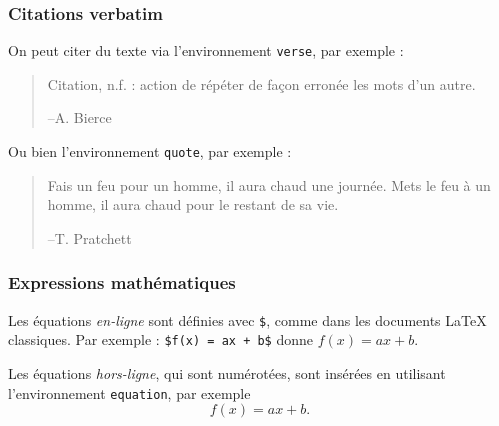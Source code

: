 \documentclass[10pt,    %
    french,             %
    xcolor=table,       %
    envcountsect        %
]{beamer}
\begin{document}
\begin{frame}
    \frametitle{Citations verbatim}
    
    \vspace{0.25cm}
    On peut citer du texte via l'environnement \texttt{verse}, par exemple :
    \begin{verse}
        Citation, n.f. : action de répéter de façon erronée les mots d’un autre. \\ 
        \vspace{-0.5cm}
        \begin{flushright}--A. Bierce\end{flushright}
    \end{verse}
    
    Ou bien l'environnement \texttt{quote}, par exemple :
    \begin{quote}
        Fais un feu pour un homme, il aura chaud une journée. Mets le feu à un homme, il aura chaud pour le restant de sa vie. \\ 
        \vspace{-0.5cm}
        \begin{flushright}--T. Pratchett\end{flushright}
    \end{quote}
\end{frame}
    
\begin{frame}
    \frametitle{Expressions mathématiques}
    
    Les équations \textit{en-ligne} sont définies avec \texttt{\$}, comme dans les documents \LaTeX{} classiques. Par exemple : \texttt{\$f(x) = ax + b\$} donne $f(x)=ax + b$.
    
    \vspace{0.25cm}
    Les équations \textit{hors-ligne}, qui sont numérotées, sont insérées en utilisant l'environnement \texttt{equation}, par exemple
    \begin{equation}
        \label{equ:affine}
        f(x) = ax + b.
    \end{equation}
\end{frame}




\end{document}
